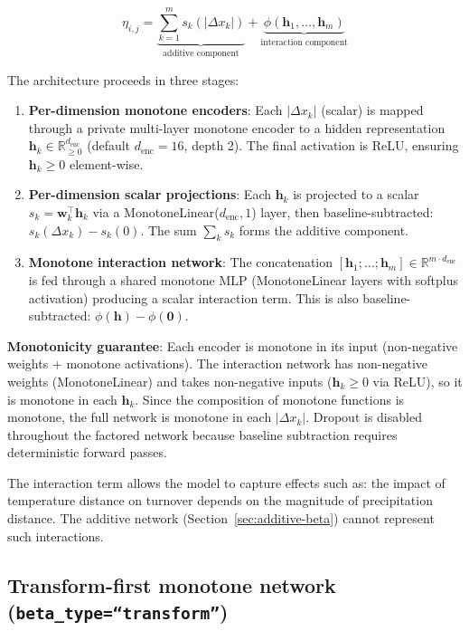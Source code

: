 \documentclass{article}
\begin{document}
\begin{equation}
    \eta_{i,j} = \underbrace{\sum_{k=1}^{m} s_k\!\left(|\Delta x_k|\right)}_{\text{additive component}} + \underbrace{\phi\!\left(\mathbf{h}_1, \ldots, \mathbf{h}_m\right)}_{\text{interaction component}}
\end{equation}

The architecture proceeds in three stages:
\begin{enumerate}
    \item \textbf{Per-dimension monotone encoders}: Each $|\Delta x_k|$ (scalar) is mapped through a private multi-layer monotone encoder to a hidden representation $\mathbf{h}_k \in \mathbb{R}^{d_{\text{enc}}}_{\geq 0}$ (default $d_{\text{enc}} = 16$, depth 2). The final activation is ReLU, ensuring $\mathbf{h}_k \geq 0$ element-wise.
    
    \item \textbf{Per-dimension scalar projections}: Each $\mathbf{h}_k$ is projected to a scalar $s_k = \mathbf{w}_k^\top \mathbf{h}_k$ via a MonotoneLinear($d_{\text{enc}}, 1$) layer, then baseline-subtracted: $s_k(\Delta x_k) - s_k(0)$. The sum $\sum_k s_k$ forms the additive component.
    
    \item \textbf{Monotone interaction network}: The concatenation $[\mathbf{h}_1; \ldots; \mathbf{h}_m] \in \mathbb{R}^{m \cdot d_{\text{enc}}}$ is fed through a shared monotone MLP (MonotoneLinear layers with softplus activation) producing a scalar interaction term. This is also baseline-subtracted: $\phi(\mathbf{h}) - \phi(\mathbf{0})$.
\end{enumerate}

\textbf{Monotonicity guarantee}: Each encoder is monotone in its input (non-negative weights + monotone activations). The interaction network has non-negative weights (MonotoneLinear) and takes non-negative inputs ($\mathbf{h}_k \geq 0$ via ReLU), so it is monotone in each $\mathbf{h}_k$. Since the composition of monotone functions is monotone, the full network is monotone in each $|\Delta x_k|$. Dropout is disabled throughout the factored network because baseline subtraction requires deterministic forward passes.

The interaction term allows the model to capture effects such as: the impact of temperature distance on turnover depends on the magnitude of precipitation distance. The additive network (Section~\ref{sec:additive-beta}) cannot represent such interactions.

\subsection{Transform-first monotone network (\texttt{beta\_type=``transform''})}
\label{sec:transform-beta}
\end{document}
